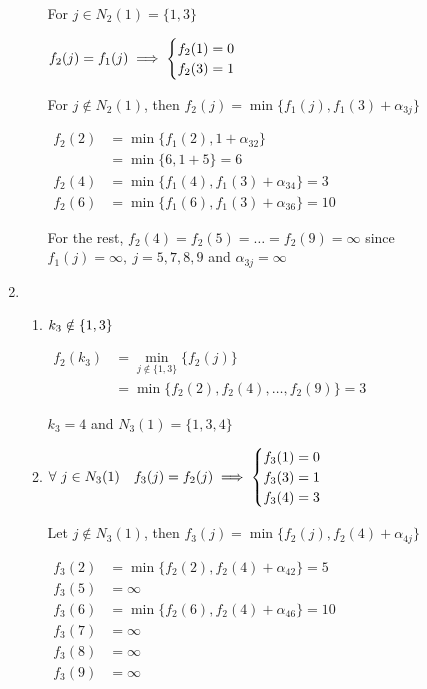 \begin{prob}
\begin{sol}
\begin{enumerate}[label = {$\underline{i =\arabic*:}$}]
\begin{enumerate}[start = 1, label = {\protect\trc{$\mathbf{Step \ {\arabic*}}$}}]
    For $j\in N_2(1)=\{1,3\}$
    
    $f_2(j)=f_1(j)\implies 
    \begin{cases} f_2(1)=0\\ f_2(3)=1 \end{cases}$
    
    For $j\notin N_2(1)$, then $f_2(j)=\min\{f_1(j),f_1(3)+\alpha_{3j}\}$
    
    $\begin{aligned} 
    f_2(2) &= \min\{f_1(2),1+\alpha_{32}\}\\
           &= \min\{6,1+5\}=6 \\
    f_2(4) &=\min\{f_1(4),f_1(3)+\alpha_{34}\}=3 \\
    f_2(6) &=\min\{f_1(6),f_1(3)+\alpha_{36}\}=10
    \end{aligned}$
    
    For the rest, $f_2(4)=f_2(5)=\dots=f_2(9)=\infty$ since $f_1(j)=\infty, \ j=5,7,8,9$ and $\alpha_{3j}=\infty$
    \end{enumerate}
    
    \item \hspace{0.1cm} \\
    \begin{enumerate}[start = 1, label = {\protect\trc{$\mathbf{S_{\arabic*}}$}}]
    \item $k_3\notin\left\{1,3\right\}$
    
    $\begin{aligned}
    f_2(k_3) &= \min\limits_{j\notin\{1,3\}}\{f_2(j)\} \\
             &= \min\{f_2(2),f_2(4),\dots,f_2(9)\}=3
    \end{aligned}$
    
    \imp $k_3=4$ and $N_3(1)=\{1,3,4\}$
    
    \item $\forall \ j\in N_3(1)\quad f_3(j)=f_2(j)\implies \begin{cases} f_3(1)=0 \\ f_3(3)=1 \\ f_3(4)=3 \end{cases}$
    
    Let $j\notin N_3(1)$, then $f_3(j)=\min\{f_2(j),f_2(4)+\alpha_{4j}\}$
    
    $\begin{aligned}
    f_3(2) &= \min\{f_2(2), f_2(4)+\alpha_{42}\} =5\\
    f_3(5) &= \infty \\
    f_3(6) &= \min\{f_2(6), f_2(4) + \alpha_{46}\}=10\\
    f_3(7) &= \infty \\
    f_3(8) &= \infty \\
    f_3(9) &= \infty \\
    \end{aligned}$
    \end{enumerate}
    

\end{enumerate}
\end{sol}
\end{prob}
